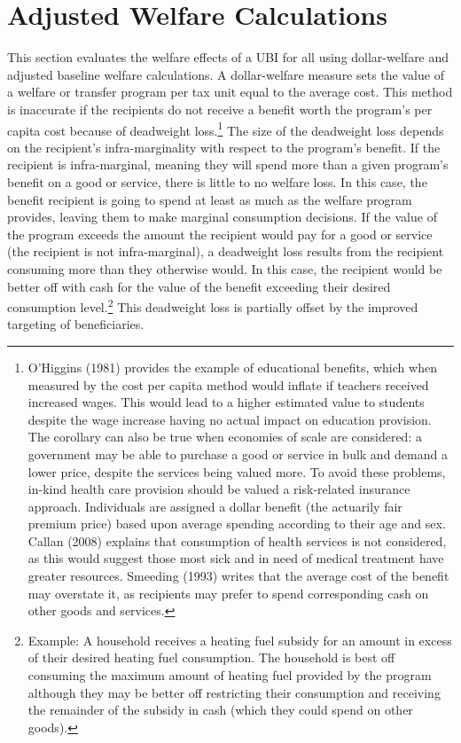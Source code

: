 \documentclass{article}
\begin{document}
\section{Adjusted Welfare Calculations}
This section evaluates the welfare effects of a UBI for all using dollar-welfare and adjusted baseline welfare calculations. A dollar-welfare measure sets the value of a welfare or transfer program per tax unit equal to the average cost. This method is inaccurate if the recipients do not receive a benefit worth the program’s per capita cost because of deadweight loss.\footnote{ O'Higgins (1981) provides the example of educational benefits, which when measured by the cost per capita method would inflate if teachers received increased wages. This would lead to a higher estimated value to students despite the wage increase having no actual impact on education provision. The corollary can also be true when economies of scale are considered: a government may be able to purchase a good or service in bulk and demand a lower price, despite the services being valued more. To avoid these problems, in-kind health care provision should be valued a risk-related insurance approach. Individuals are assigned a dollar benefit (the actuarily fair premium price) based upon average spending according to their age and sex. Callan (2008) explains that consumption of health services is not considered, as this would suggest those most sick and in need of medical treatment have greater resources. Smeeding (1993) writes that the average cost of the benefit may overstate it, as recipients may prefer to spend corresponding cash on other goods and services.} The size of the deadweight loss depends on the recipient’s infra-marginality with respect to the program’s benefit. If the recipient is infra-marginal, meaning they will spend more than a given program’s benefit on a good or service, there is little to no welfare loss. In this case, the benefit recipient is going to spend at least as much as the welfare program provides, leaving them to make marginal consumption decisions. If the value of the program exceeds the amount the recipient would pay for a good or service (the recipient is not infra-marginal), a deadweight loss results from the recipient consuming more than they otherwise would. In this case, the recipient would be better off with cash for the value of the benefit exceeding their desired consumption level.\footnote{Example: A household receives a heating fuel subsidy for an amount in excess of their desired heating fuel consumption. The household is best off consuming the maximum amount of heating fuel provided by the program although they may be better off restricting their consumption and receiving the remainder of the subsidy in cash (which they could spend on other goods).} This deadweight loss is partially offset by the improved targeting of beneficiaries.
\end{document}

